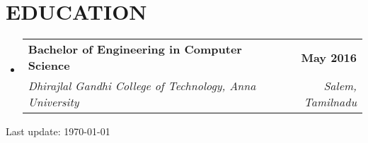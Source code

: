 \documentclass[letterpaper,11pt]{article}
\makeatletter
\newcommand{\resumeSubheading}[4]{
  \vspace{-2pt}\item
    \begin{tabular*}{1.0\textwidth}[t]{l@{\extracolsep{\fill}}r}
      \textbf{#1} & \textbf{\small #2} \\
      \textit{\small#3} & \textit{\small #4} \\
    \end{tabular*}\vspace{-7pt}
}
\newcommand{\resumeSubHeadingListStart}{\begin{itemize}[leftmargin=0.0in, label={}]}
\newcommand{\resumeSubHeadingListEnd}{\end{itemize}}
\makeatother
\begin{document}
\section{EDUCATION}
  \resumeSubHeadingListStart
    \resumeSubheading
      {Bachelor of Engineering in Computer Science }{May 2016}
      {Dhirajlal Gandhi College of Technology, Anna University}{Salem, Tamilnadu}
  \resumeSubHeadingListEnd
  
\vspace{100pt} %
\begin{center}
    Last update: \today
\end{center}
     
\end{document}
